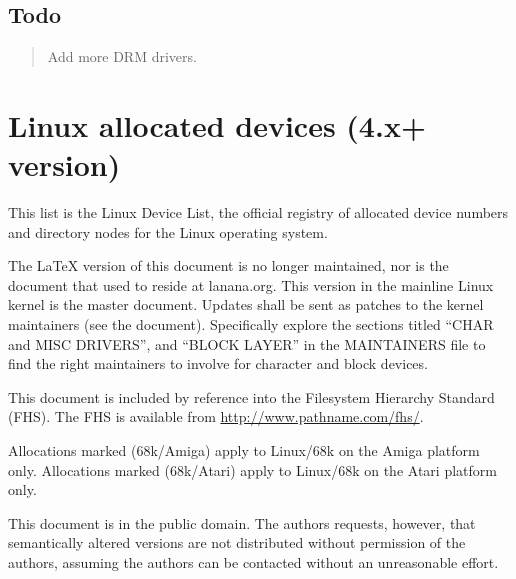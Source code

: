 \documentclass[a4paper,8pt,english]{sphinxmanual}
\begin{document}
\section{Todo}
\label{admin-guide/kernel-parameters:todo}\begin{quote}

Add more DRM drivers.
\end{quote}


\chapter{Linux allocated devices (4.x+ version)}
\label{admin-guide/devices:linux-allocated-devices-4-x-version}\label{admin-guide/devices::doc}
This list is the Linux Device List, the official registry of allocated
device numbers and  directory nodes for the Linux operating
system.

The LaTeX version of this document is no longer maintained, nor is
the document that used to reside at lanana.org.  This version in the
mainline Linux kernel is the master document.  Updates shall be sent
as patches to the kernel maintainers (see the
 document).
Specifically explore the sections titled ``CHAR and MISC DRIVERS'', and
``BLOCK LAYER'' in the MAINTAINERS file to find the right maintainers
to involve for character and block devices.

This document is included by reference into the Filesystem Hierarchy
Standard (FHS).  The FHS is available from \href{http://www.pathname.com/fhs/}{http://www.pathname.com/fhs/}.

Allocations marked (68k/Amiga) apply to Linux/68k on the Amiga
platform only.  Allocations marked (68k/Atari) apply to Linux/68k on
the Atari platform only.

This document is in the public domain.  The authors requests, however,
that semantically altered versions are not distributed without
permission of the authors, assuming the authors can be contacted without
an unreasonable effort.
\end{document}
